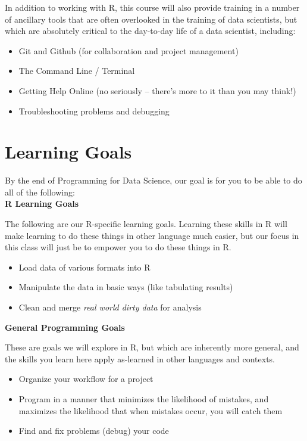 \documentclass[12pt]{article}
\begin{document}
In addition to working with R, this course will also provide training in a number of ancillary tools that are often overlooked in the training of data scientists, but which are absolutely critical to the day-to-day life of a data scientist, including:

\begin{itemize}
	\item Git and Github (for collaboration and project management)
	\item The Command Line / Terminal
	\item Getting Help Online (no seriously -- there's more to it than you may think!)
	\item Troubleshooting problems and debugging
\end{itemize}


\section{Learning Goals}

By the end of Programming for Data Science, our goal is for you to be able to do all of the following: \\

\textbf{R Learning Goals}

The following are our R-specific learning goals. Learning these skills in R will make learning to do these things in other language much easier, but our focus in this class will just be to empower you to do these things in R.

\begin{itemize}
    \item Load data of various formats into R
    \item Manipulate the data in basic ways (like tabulating results)
	\item Clean and merge \emph{real world dirty data} for analysis
\end{itemize}

\textbf{General Programming Goals}

These are goals we will explore in R, but which are inherently more general, and the skills you learn here apply as-learned in other languages and contexts.

\begin{itemize}
	\item Organize your workflow for a project
	\item Program in a manner that minimizes the likelihood of mistakes, and maximizes the likelihood that when mistakes occur, you will catch them
	\item Find and fix problems (debug) your code
\end{itemize}
\end{document}
